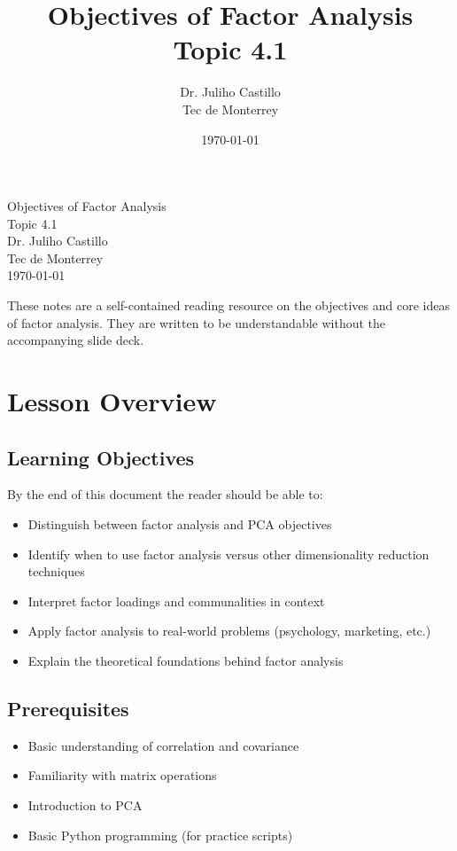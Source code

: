 \documentclass[a4paper,11pt]{tufte-book}
\title{Objectives of Factor Analysis\\\large Topic 4.1}
\author{Dr. Juliho Castillo\\Tec de Monterrey}
\date{\today}
\begin{document}
\begingroup
  \centering
  {\Huge\textcolor{tecblue}{Objectives of Factor Analysis}}\\[0.5em]
  {\large Topic 4.1}\\[1em]
  {\normalsize Dr. Juliho Castillo\\Tec de Monterrey}\\[0.5em]
  {\normalsize \today}
\par\vspace{1em}\endgroup

These notes are a self-contained reading resource on the objectives and core ideas of factor analysis. They are written to be understandable without the accompanying slide deck.

\tableofcontents
\newpage

\section{Lesson Overview}

\subsection{Learning Objectives}
By the end of this document the reader should be able to:
\begin{itemize}
  \item Distinguish between factor analysis and PCA objectives
  \item Identify when to use factor analysis versus other dimensionality reduction techniques
  \item Interpret factor loadings and communalities in context
  \item Apply factor analysis to real-world problems (psychology, marketing, etc.)
  \item Explain the theoretical foundations behind factor analysis
\end{itemize}

\subsection{Prerequisites}
\begin{itemize}
  \item Basic understanding of correlation and covariance
  \item Familiarity with matrix operations
  \item Introduction to PCA
  \item Basic Python programming (for practice scripts)
\end{itemize}
\end{document}
